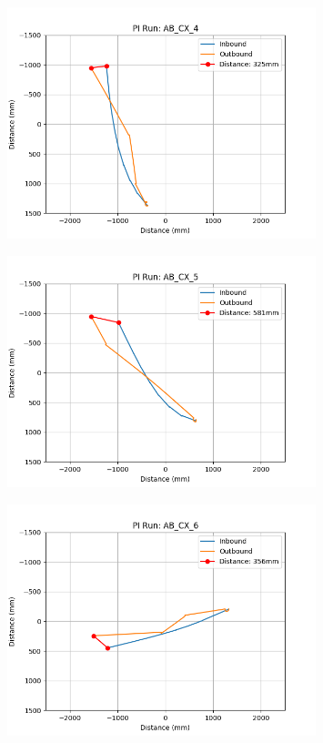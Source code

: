 \documentclass[a4paper,11pt,twoside,openright]{article}
\begin{document}
\begin{figure}[h!]
  \centering
  \includegraphics[width=0.8\textwidth]{AB_CX_4}
  \caption{\label{fig:abcx4}}
\end{figure}

\begin{figure}[h!]
  \centering
  \includegraphics[width=0.8\textwidth]{AB_CX_5}
  \caption{\label{fig:abcx5}}
\end{figure}

\begin{figure}[h!]
  \centering
  \includegraphics[width=0.8\textwidth]{AB_CX_6}
  \caption{\label{fig:abcx6}}
\end{figure}
\end{document}
